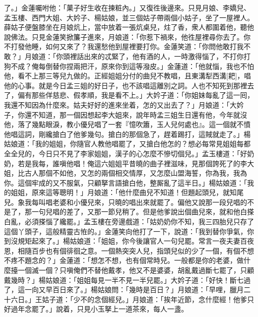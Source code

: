 了。」金蓮囑咐他：「菓子好生收在揀粧內。」又復徃後邊來。只見月娘、李嬌兒、孟玉樓、西門大姐、大妗子、楊姑娘，並三個姑子帶兩個小姑子，坐了一屋裡人。薛姑子便盤膝坐在月娘炕上，{}當中放着一張炕桌兒，炷了香，衆人都圍着他，聽他說佛法。只見金蓮笑掀簾子進來，{}月娘道：「你惹下禍來，他徃屋裡尋你去了。你不打發他睡，如何又來了？我還愁他到屋裡要打你。金蓮笑道：「你問他敢打我不敢？」{}月娘道：「你頭裡話出來的忒緊了，他有酒的人，一時激得惱了，不打你打狗不成？俺每倒替你捏兩把汗，原來你到這等潑皮。」金蓮道：「他就惱，我也不怕他，看不上那三等兒九做的。正經姐姐分付的曲兒不教唱，且東溝犁西溝[耙]，唱他的心事。就是今日孟三姐的好日子，也不該唱這離別之詞。{}人也不知死到那裡去了，偏有那些佯慈悲、假孝順，我是看不上。」大妗子道：「你姐妹每亂了這一囘，我還不知因為什麼來。姑夫好好的進來坐着，怎的又出去了？」月娘道：「大妗子，你還不知道，那一個因想起李大姐來，說年時孟三姐生日還有他，今年就沒他，落了幾點眼淚，教小優兒唱了一套『憶吹簫，玉人兒何處也』。這一個就不憤他唱這詞，剛纔搶白了他爹幾句。搶白的那個急了，趕着踢打，這賊就走了。」楊姑娘道：「我的姐姐，你隨官人教他唱罷了，又搶白他怎的？想必每常見姐姐每都全全兒的，今日只不見了李家姐姐，漢子的心怎麼不慘切個兒。」孟玉樓道：「好奶奶，若是我每，誰嗔他唱！俺這六姐姐平昔曉的曲子裡滋味，見那個誇死了的李大姐，比古人那個不如他，又怎的兩個相交情厚，又怎麼山盟海誓，你為我，我為你。這個牢成的又不服氣，只顧拏言語搶白他，整厮亂了這半日。」楊姑娘道：「我的姐姐，原來這等聰明！」月娘道：「他什麼曲兒不知道！但題起頭兒，就知尾兒。象我每叫唱老婆和小優兒來，只曉的唱出來就罷了。偏他又說那一段兒唱的不是了，那一句兒唱的差了，又那一節兒稍了。但是他爹說出個曲兒來，就和他白搽白亂，必須搽惱了纔罷。」孟玉樓在旁邊戲道：「姑奶奶你不知，我三四胎兒只存了這個丫頭子，這般精靈古恠的。」金蓮笑向他打了一下，說道：「我到替你爭氣，你到沒規矩起來了。」楊姑娘道：「姐姐，你今後讓官人一句兒罷。常言一夜夫妻百夜恩，相隨百步也有個徘徊之意。一個熱突突人兒，指頭兒似的少了一個，{}有個不想不疼不題念的？」金蓮道：「想怎不想，也有個常時兒。一般都是你的老婆，做什麼擡一個滅一個？只嗔俺們不替他戴孝，他又不是婆婆，胡亂戴過斷七罷了，{}只顧戴幾時？」楊姑娘道：「姐姐每見一半不見一半兒罷。」大妗子道：「好快！斷七過了，這一向又早百日來了。」{}楊姑娘問：「幾時是百日？」月娘道：「早哩，臘月二十六日。」王姑子道：「少不的念個經兒。」{}月娘道：「挨年近節，念什麼經！他爹只好過年念罷了。」說着，只見小玉拏上一道茶來，每人一盞。

